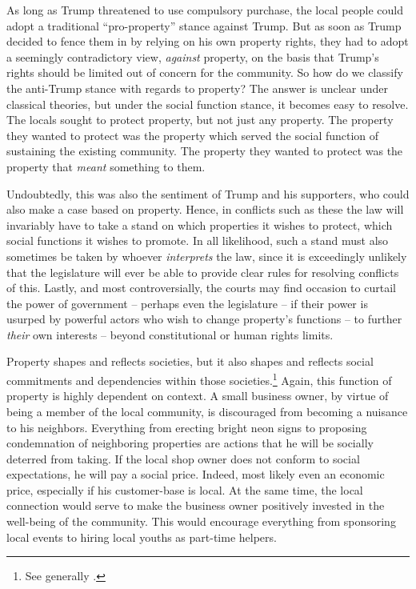 As long as Trump threatened to use compulsory purchase, the local people could adopt a traditional ``pro-property'' stance against Trump. But as soon as Trump decided to fence them in by relying on his own property rights, they had to adopt a seemingly contradictory view, {\it against} property, on the basis that Trump's rights should be limited out of concern for the community. So how do we classify the anti-Trump stance with regards to property? The answer is unclear under classical theories, but under the social function stance, it becomes easy to resolve. The locals sought to protect property, but not just any property. The property they wanted to protect was the property which served the social function of sustaining the existing community. The property they wanted to protect was the property that {\it meant} something to them.

Undoubtedly, this was also the sentiment of Trump and his supporters, who could also make a case based on property. Hence, in conflicts such as these the law will invariably have to take a stand on which properties it wishes to protect, which social functions it wishes to promote. In all likelihood, such a stand must also sometimes be taken by whoever {\it interprets} the law, since it is exceedingly unlikely that the legislature will ever be able to provide clear rules for resolving conflicts of this. Lastly, and most controversially, the courts may find occasion to curtail the power of government -- perhaps even the legislature -- if their power is usurped by powerful actors who wish to change property's functions -- to further {\it their} own interests -- beyond constitutional or human rights limits.

Property shapes and reflects societies, but it also shapes and reflects social commitments and dependencies within those societies.\footnote{See generally \cite{alexander09}.} Again, this function of property is highly dependent on context. A small business owner, by virtue of being a member of the local community, is discouraged from becoming a nuisance to his neighbors. Everything from erecting bright neon signs to proposing condemnation of neighboring properties are actions that he will be socially deterred from taking. If the local shop owner does not conform to social expectations, he will pay a social price. Indeed, most likely even an economic price, especially if his customer-base is local. At the same time, the local connection would serve to make the business owner positively invested in the well-being of the community. This would encourage everything from sponsoring local events to hiring local youths as part-time helpers.

